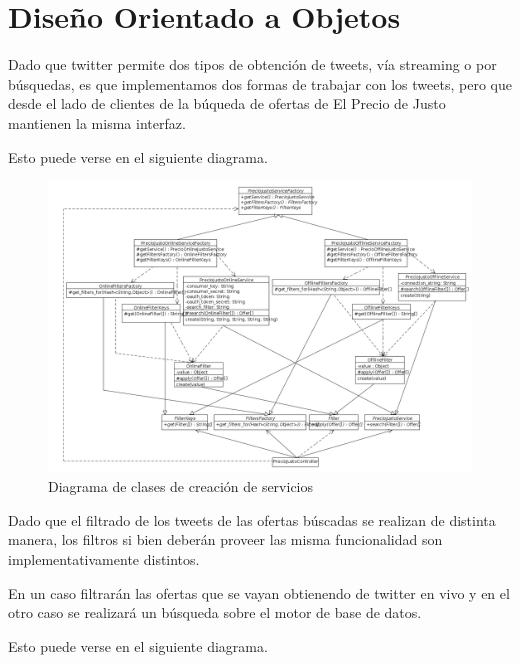 \section{Diseño Orientado a Objetos}

Dado que twitter permite dos tipos de obtención de tweets, vía streaming o por búsquedas, es que implementamos dos formas de trabajar con los tweets, pero que desde el lado de clientes de la búqueda de ofertas de El Precio de Justo mantienen la misma interfaz.

Esto puede verse en el siguiente diagrama.

\begin{figure}[cht]
\includegraphics[width=0.8\paperwidth]{./imgs/class_diagram_service_factory_v2.png}
\caption{Diagrama de clases de creación de servicios}
\end{figure}

Dado que el filtrado de los tweets de las ofertas búscadas se realizan de distinta manera, los filtros si bien deberán proveer las misma funcionalidad son implementativamente distintos.

En un caso filtrarán las ofertas que se vayan obtienendo de twitter en vivo y en el otro caso se realizará un búsqueda sobre el motor de base de datos.

Esto puede verse en el siguiente diagrama. 

